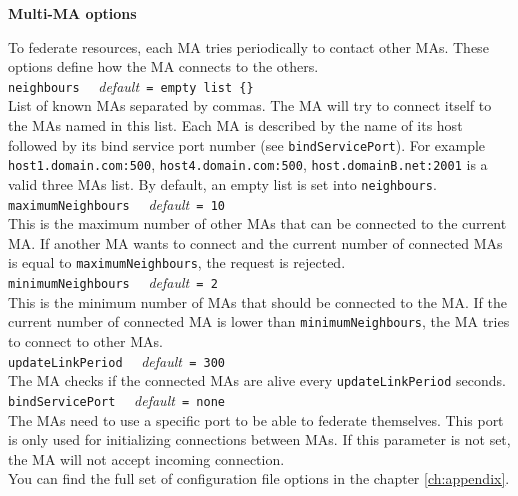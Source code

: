 \noindent
\textbf{Multi-MA options}

\label{sec:multimaconfig}

To federate resources, each MA tries periodically to contact other MAs. These
options define how the MA connects to the others.\\

\noindent
\texttt{neighbours} \ \ \emph{default}\texttt{ = empty list \{\}}\\ List of
known MAs separated by commas. The MA will try to connect itself to the MAs
named in this list. Each MA is described by the name of its host followed by
its bind service port number (see \texttt{bindServicePort}). For example
\texttt{host1.domain.com:500}, \texttt{host4.domain.com:500},
\texttt{host.domainB.net:2001} is a valid three MAs list. By default, an empty
list is set into \texttt{neighbours}.\\

\noindent
\texttt{maximumNeighbours} \ \ \emph{default}\texttt{ = 10}\\ This is the
maximum number of other MAs that can be connected to the current MA.  If
another MA wants to connect and the current number of connected MAs is equal to
\texttt{maximumNeighbours}, the request is rejected.\\

\noindent
\texttt{minimumNeighbours} \ \ \emph{default}\texttt{ = 2}\\ This is the
minimum number of MAs that should be connected to the MA. If the current number
of connected MA is lower than \texttt{minimumNeighbours}, the MA tries to
connect to other MAs.\\

\noindent
\texttt{updateLinkPeriod} \ \ \emph{default}\texttt{ = 300}\\ The MA checks if
the connected MAs are alive every \texttt{updateLinkPeriod} seconds.\\

\noindent
\texttt{bindServicePort} \ \ \emph{default}\texttt{ = none}\\ The MAs need to
use a specific port to be able to federate themselves. This port is only used
for initializing connections between MAs. If this parameter is not set, the MA
will not accept incoming connection.\\

You can find the full set of \diet configuration file options in the chapter
\ref{ch:appendix}.

